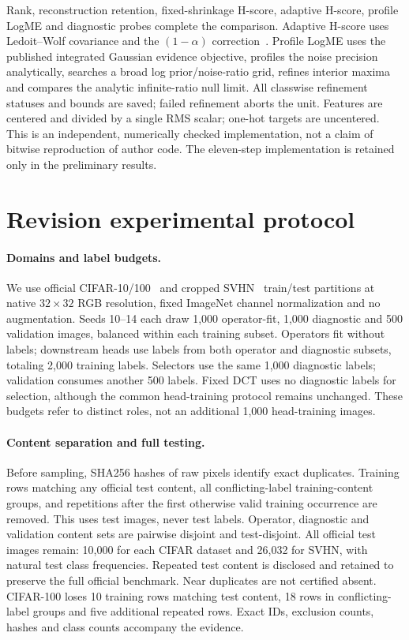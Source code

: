 \documentclass[11pt]{article}
\begin{document}
Rank, reconstruction retention, fixed-shrinkage H-score, adaptive H-score, profile LogME and diagnostic probes complete the comparison. Adaptive H-score uses Ledoit--Wolf covariance and the $(1-\alpha)$ correction~\citep{ibrahim2023transferability}. Profile LogME uses the published integrated Gaussian evidence objective, profiles the noise precision analytically, searches a broad log prior/noise-ratio grid, refines interior maxima and compares the analytic infinite-ratio null limit. All classwise refinement statuses and bounds are saved; failed refinement aborts the unit. Features are centered and divided by a single RMS scalar; one-hot targets are uncentered. This is an independent, numerically checked implementation, not a claim of bitwise reproduction of author code. The eleven-step implementation is retained only in the preliminary results.

\section{Revision experimental protocol}
\paragraph{Domains and label budgets.}
We use official CIFAR-10/100~\citep{krizhevsky2009cifar} and cropped SVHN~\citep{netzer2011svhn} train/test partitions at native $32\times32$ RGB resolution, fixed ImageNet channel normalization and no augmentation. Seeds 10--14 each draw 1,000 operator-fit, 1,000 diagnostic and 500 validation images, balanced within each training subset. Operators fit without labels; downstream heads use labels from both operator and diagnostic subsets, totaling 2,000 training labels. Selectors use the same 1,000 diagnostic labels; validation consumes another 500 labels. Fixed DCT uses no diagnostic labels for selection, although the common head-training protocol remains unchanged. These budgets refer to distinct roles, not an additional 1,000 head-training images.

\paragraph{Content separation and full testing.}
Before sampling, SHA256 hashes of raw pixels identify exact duplicates. Training rows matching any official test content, all conflicting-label training-content groups, and repetitions after the first otherwise valid training occurrence are removed. This uses test images, never test labels. Operator, diagnostic and validation content sets are pairwise disjoint and test-disjoint. All official test images remain: 10,000 for each CIFAR dataset and 26,032 for SVHN, with natural test class frequencies. Repeated test content is disclosed and retained to preserve the full official benchmark. Near duplicates are not certified absent. CIFAR-100 loses 10 training rows matching test content, 18 rows in conflicting-label groups and five additional repeated rows. Exact IDs, exclusion counts, hashes and class counts accompany the evidence.
\end{document}
